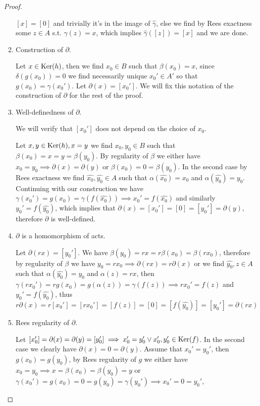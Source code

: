 \begin{proof}[Proof]
\begin{enumerate}
        $[x]=[0]$ and trivially it's in the image of $\hat{\gamma}$, else we find by Rees exactness some $z\in A$ s.t. $\gamma(z)=x$, which implies 
        $\hat{\gamma}([z])=[x]$ and we are done.
        \item Construction of $\partial$.\par 
        Let $x\in\mathrm{Ker}(h)$, then we find $x_0\in B$ such that $\beta(x_0)=x$, since $\delta(g(x_0))=0$ we find 
        necessarily unique $x_0'\in A'$ so that $g(x_0)=\gamma(x_0')$. Let $\partial(x) = [x_0']$. We will fix this notation of the 
        construction of $\partial$ for the rest of the proof.
        \item Well-definedness of $\partial$. \par
        We will verify that $[x_0']$ does not depend on the choice of $x_0$.\par
        Let $x,y\in\mathrm{Ker}(h),x=y$ we find $x_0,y_0\in B$ such that $\beta(x_0)=x=y=\beta(y_0)$. By regularity of $\beta$ 
        we either have $x_0=y_0 \implies \partial(x)=\partial(y)$ or $\beta(x_0)=0=\beta(y_0)$. In the second case
        by Rees exactness we find $\hat{x_0},\hat{y_0}\in A$ such that $\alpha(\hat{x_0})=x_0$ and $\alpha(\hat{y_0})=y_0$. 
        Continuing with our construction we have 
        $\gamma(x_0')=g(x_0)=\gamma(f(\hat{x_0})) \implies x_0'=f(\hat{x_0})$ and similarly $y_0'=f(\hat{y_0})$,
        which implies that $\partial(x)=[x_0']=[0]=[y_0']=\partial(y)$, therefore $\partial$ is well-defined.
        \item $\partial$ is a homomorphism of acts.\par 
        Let $\partial(rx)=[y_0']$. We have $\beta(y_0)=rx=r\beta(x_0)=\beta(rx_0)$, therefore by regularity of $\beta$ 
        we have $y_0=rx_0 \implies \partial(rx)=r\partial(x)$ or we find $\hat{y_0},z\in A$ such that 
        $\alpha(\hat{y_0})=y_0$ and $\alpha(z)= rx$, then  $\gamma(rx_0')=rg(x_0)=g(\alpha(z))=\gamma(f(z)) \implies rx_0'=f(z)$
        and $y_0' = f(\hat{y_0})$, thus
        \[
            r\partial(x)=r[x_0']=[rx_0']=[f(z)]=[0]=[f(\hat{y_0})]=[y_0']=\partial(rx)
        \] 
        \item Rees regularity of $\partial$.\par
        Let $[x_0']=\partial(x)=\partial(y)=[y_0'] \implies x_0'=y_0' \lor x_0',y_0'\in\mathrm{Ker}(f)$. In the second case 
        we clearly have $\partial(x)=0=\partial(y)$. Assume that $x_0'=y_0'$, then $g(x_0)=g(y_0)$, by Rees regularity of $g$
        we either have $x_0=y_0 \implies x=\beta(x_0)=\beta(y_0)=y$ or $\gamma(x_0')=g(x_0)=0=g(y_0)=\gamma(y_0') \implies x_0'=0=y_0'$, 

\end{enumerate}
\end{proof}
